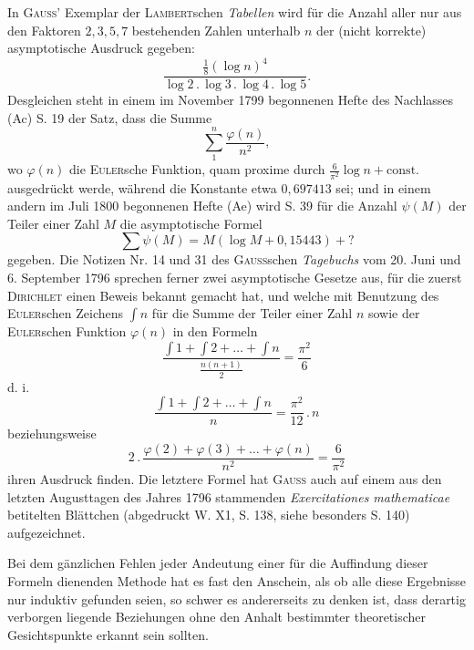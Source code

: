 In \textsc{Gauss}’ Exemplar der \textsc{Lambert}schen \textit{Tabellen} wird für die Anzahl aller nur aus den Faktoren \(2,3,5,7\) bestehenden Zahlen unterhalb \(n\) der (nicht korrekte) asymptotische Ausdruck gegeben:
\[
\frac{\frac18(\log n)^4}{\log2\mathbin{.}\log3\mathbin{.}\log4\mathbin{.}\log5}.
\]
Desgleichen steht in einem im November 1799 begonnenen Hefte des Nachlasses (Ac) S. 19 der Satz, dass die Summe
\[
\sum_1^n\frac{\varphi(n)}{n^2},
\]
wo \(\varphi(n)\) die \textsc{Euler}sche Funktion, quam proxime durch \(\frac6{\pi^2}\log n+\mathrm{const.}\) ausgedrückt werde, während die Konstante etwa \(0{,}697413\) sei; und in einem andern im Juli 1800 begonnenen Hefte (Ae) wird S. 39 für die Anzahl \(\psi(M)\) der Teiler einer Zahl \(M\) die asymptotische Formel
\[
\sum\psi(M)=M(\log M+0{,}15443)+?
\]
gegeben. Die Notizen Nr. 14 und 31 des \textsc{Gauss}schen \textit{Tagebuchs} vom 20. Juni und 6. September 1796 sprechen ferner zwei asymptotische Gesetze aus, für die zuerst \textsc{Dirichlet} einen Beweis bekannt gemacht hat, und welche mit Benutzung des \textsc{Euler}schen Zeichens \(\int n\) für die Summe der Teiler einer Zahl \(n\) sowie der \textsc{Euler}schen Funktion \(\varphi(n)\) in den Formeln
\[
\frac{\int1+\int2+\ldots+\int n}{\frac{n(n+1)}2}=\frac{\pi^2}{6}
\]
d. i.
\[
\frac{\int1+\int2+\ldots+\int n}{n}=\frac{\pi^2}{12}\mathbin{.}n
\]
\newpage{}
\noindent beziehungsweise
\[
2\mathbin{.}\frac{\varphi(2)+\varphi(3)+\ldots+\varphi(n)}{n^2}=\frac6{\pi^2}
\]
ihren Ausdruck finden. Die letztere Formel hat \textsc{Gauss} auch auf einem aus den letzten Augusttagen des Jahres 1796 stammenden \textit{Exercitationes mathematicae} betitelten Blättchen (abgedruckt W. X1, S. 138, siehe besonders S. 140) aufgezeichnet.

Bei dem gänzlichen Fehlen jeder Andeutung einer für die Auffindung dieser Formeln dienenden Methode hat es fast den Anschein, als ob alle diese Ergebnisse nur induktiv gefunden seien, so schwer es andererseits zu denken ist, dass derartig verborgen liegende Beziehungen ohne den Anhalt bestimmter theoretischer Gesichtspunkte erkannt sein sollten.
